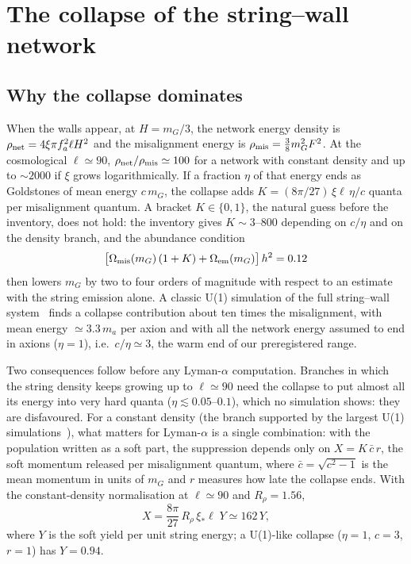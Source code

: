 \documentclass[11pt,a4paper]{article}
\begin{document}
\section{The collapse of the string--wall network}
\label{sec:collapse}

\subsection{Why the collapse dominates}

When the walls appear, at $H=m_G/3$, the network energy density is $\rho_{\rm net}=4\xi\pi f_a^2\ell H^2$ and the misalignment energy is $\rho_{\rm mis}=\tfrac38m_G^2F^2$.
At the cosmological $\ell\simeq90$, $\rho_{\rm net}/\rho_{\rm mis}\simeq100$ for a network with constant density and up to $\sim2000$ if $\xi$ grows logarithmically.
If a fraction $\eta$ of that energy ends as Goldstones of mean energy $c\,m_G$, the collapse adds $K=(8\pi/27)\,\xi\ell\,\eta/c$ quanta per misalignment quantum.
A bracket $K\in\{0,1\}$, the natural guess before the inventory, does not hold: the inventory gives $K\sim3$--$800$ depending on $c/\eta$ and on the density branch, and the abundance condition
\begin{equation}
\big[\Omega_{\rm mis}(m_G)\,(1+K) + \Omega_{\rm em}(m_G)\big]\,h^2 = 0.12
\end{equation}
then lowers $m_G$ by two to four orders of magnitude with respect to an estimate with the string emission alone.
A classic U(1) simulation of the full string--wall system~\cite{Hiramatsu2012} finds a collapse contribution about ten times the misalignment, with mean energy $\simeq3.3\,m_a$ per axion and with all the network energy assumed to end in axions ($\eta=1$), i.e.\ $c/\eta\simeq3$, the warm end of our preregistered range.

Two consequences follow before any Lyman-$\alpha$ computation.
Branches in which the string density keeps growing up to $\ell\simeq90$ need the collapse to put almost all its energy into very hard quanta ($\eta\lesssim0.05$--$0.1$), which no simulation shows: they are disfavoured.
For a constant density (the branch supported by the largest U(1) simulations~\cite{Correia2025spectrum,Correia2024terasite}), what matters for Lyman-$\alpha$ is a single combination: with the population written as a soft part, the suppression depends only on $X=K\,\bar c\,r$, the soft momentum released per misalignment quantum, where $\bar c=\sqrt{c^2-1}$ is the mean momentum in units of $m_G$ and $r$ measures how late the collapse ends.
With the constant-density normalisation at $\ell\simeq90$ and $R_\rho=1.56$,
\begin{equation}
X = \frac{8\pi}{27}\,R_\rho\,\xi_*\ell\;Y \simeq 162\,Y ,
\end{equation}
where $Y$ is the soft yield per unit string energy; a U(1)-like collapse ($\eta=1$, $c=3$, $r=1$) has $Y=0.94$.
\end{document}
